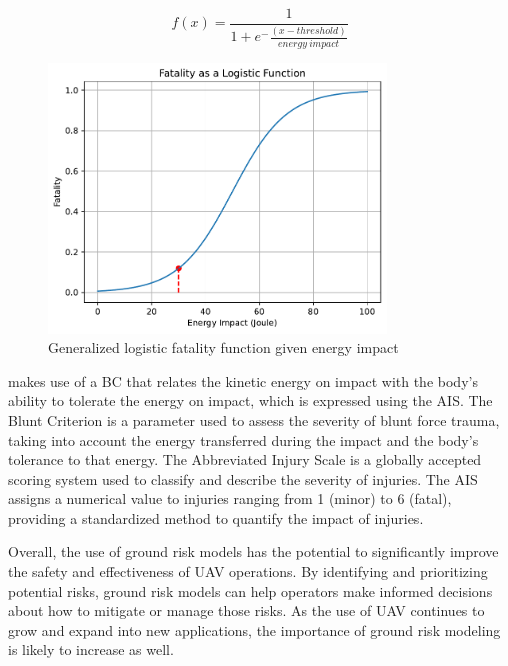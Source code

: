 \documentclass[12pt]{report}
\begin{document}
            \begin{equation}\label{eq:logisic}
                f(x) = \frac{1}{1+e^-\frac{(x-threshold)}{energy \ impact}}
            \end{equation}

            \begin{figure}[H]\label{fig:logistic}
                \centering
                \includegraphics[width=0.8\textwidth]{Plot/logistic_bounded.pdf}
                \caption{Generalized logistic fatality function given energy impact}
            \end{figure}

            \cite{magister_small_2010} makes use of a \ac{BC} that relates the kinetic energy on impact with the body's
            ability to tolerate the energy on impact, which is expressed using the \ac{AIS}. The Blunt Criterion is a
            parameter used to assess the severity of blunt force trauma, taking into account the energy transferred
            during the impact and the body's tolerance to that energy. The Abbreviated Injury Scale  is a globally
            accepted scoring system used to classify and describe the severity of injuries. The AIS assigns a numerical
            value to injuries ranging from 1 (minor) to 6 (fatal), providing a standardized method to quantify the
            impact of injuries.

        Overall, the use of ground risk models has the potential to significantly improve the safety and
        effectiveness of UAV operations. By identifying and prioritizing potential risks, ground risk models can help
        operators make informed decisions about how to mitigate or manage those risks. As the use of UAV continues to
        grow and expand into new applications, the importance of ground risk modeling is likely to increase as well.
\end{document}
